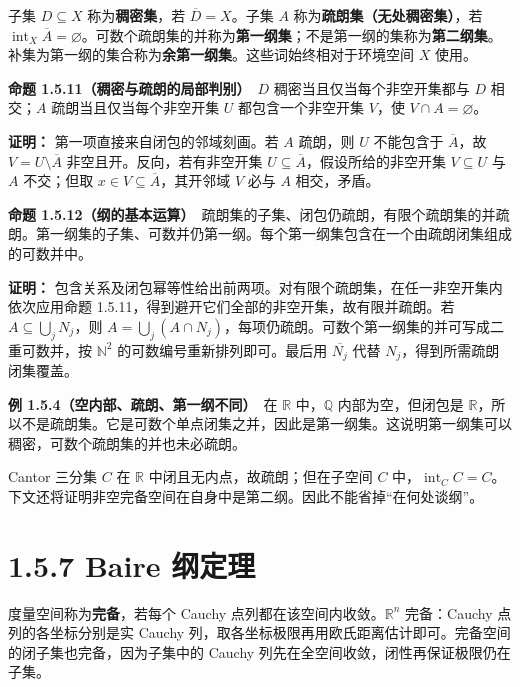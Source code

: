 \documentclass[11pt,a4paper]{article}
\begin{document}
子集 \(D\subseteq X\) 称为\textbf{稠密集}，若 \(\overline D=X\)。子集
\(A\) 称为\textbf{疏朗集（无处稠密集）}，若
\(\operatorname{int}_X\overline A=\varnothing\)。可数个疏朗集的并称为\textbf{第一纲集}；不是第一纲的集称为\textbf{第二纲集}。补集为第一纲的集合称为\textbf{余第一纲集}。这些词始终相对于环境空间
\(X\) 使用。

\textbf{命题 1.5.11（稠密与疏朗的局部判别）}　\(D\)
稠密当且仅当每个非空开集都与 \(D\) 相交；\(A\) 疏朗当且仅当每个非空开集
\(U\) 都包含一个非空开集 \(V\)，使 \(V\cap A=\varnothing\)。

\textbf{证明：} 第一项直接来自闭包的邻域刻画。若 \(A\) 疏朗，则 \(U\)
不能包含于 \(\overline A\)，故 \(V=U\setminus\overline A\)
非空且开。反向，若有非空开集
\(U\subseteq\overline A\)，假设所给的非空开集 \(V\subseteq U\) 与 \(A\)
不交；但取 \(x\in V\subseteq\overline A\)，其开邻域 \(V\) 必与 \(A\)
相交，矛盾。

\textbf{命题
1.5.12（纲的基本运算）}　疏朗集的子集、闭包仍疏朗，有限个疏朗集的并疏朗。第一纲集的子集、可数并仍第一纲。每个第一纲集包含在一个由疏朗闭集组成的可数并中。

\textbf{证明：}
包含关系及闭包幂等性给出前两项。对有限个疏朗集，在任一非空开集内依次应用命题
1.5.11，得到避开它们全部的非空开集，故有限并疏朗。若
\(A\subseteq\bigcup_jN_j\)，则
\(A=\bigcup_j(A\cap N_j)\)，每项仍疏朗。可数个第一纲集的并可写成二重可数并，按
\(\mathbb N^2\) 的可数编号重新排列即可。最后用 \(\overline{N_j}\) 代替
\(N_j\)，得到所需疏朗闭集覆盖。

\textbf{例 1.5.4（空内部、疏朗、第一纲不同）}　在 \(\mathbb R\)
中，\(\mathbb Q\) 内部为空，但闭包是
\(\mathbb R\)，所以不是疏朗集。它是可数个单点闭集之并，因此是第一纲集。这说明第一纲集可以稠密，可数个疏朗集的并也未必疏朗。

Cantor 三分集 \(C\) 在 \(\mathbb R\) 中闭且无内点，故疏朗；但在子空间
\(C\)
中，\(\operatorname{int}_C C=C\)。下文还将证明非空完备空间在自身中是第二纲。因此不能省掉``在何处谈纲''。

\section[\S{}1.5.7 Baire 纲定理]{1.5.7 Baire 纲定理}\label{baire-ux7eb2ux5b9aux7406}

度量空间称为\textbf{完备}，若每个 Cauchy
点列都在该空间内收敛。\(\mathbb R^n\) 完备：Cauchy 点列的各坐标分别是实
Cauchy
列，取各坐标极限再用欧氏距离估计即可。完备空间的闭子集也完备，因为子集中的
Cauchy 列先在全空间收敛，闭性再保证极限仍在子集。
\end{document}
